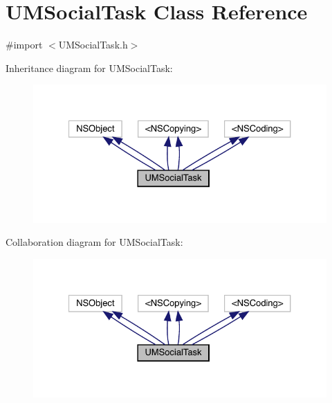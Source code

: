 \hypertarget{interface_u_m_social_task}{}\section{U\+M\+Social\+Task Class Reference}
\label{interface_u_m_social_task}


{\ttfamily \#import $<$U\+M\+Social\+Task.\+h$>$}



Inheritance diagram for U\+M\+Social\+Task\+:\nopagebreak
\begin{figure}[H]
\begin{center}
\leavevmode
\includegraphics[width=327pt]{interface_u_m_social_task__inherit__graph}
\end{center}
\end{figure}


Collaboration diagram for U\+M\+Social\+Task\+:\nopagebreak
\begin{figure}[H]
\begin{center}
\leavevmode
\includegraphics[width=327pt]{interface_u_m_social_task__coll__graph}
\end{center}
\end{figure}

